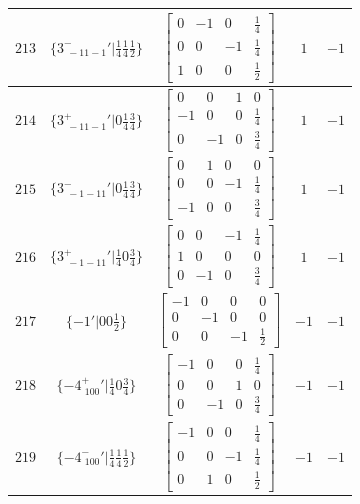 \documentclass[fleqn,8pt]{jsarticle}
\begin{document}
\begin{longtable}{ccccc}
$ 213 $ & $ \{3^{-}_{\,\,-11-1}{}'|\frac{1}{4} \frac{1}{4} \frac{1}{2}\} $ & $ \begin{bmatrix} 0 & -1 & 0 & \frac{1}{4} \\ 0 & 0 & -1 & \frac{1}{4} \\ 1 & 0 & 0 & \frac{1}{2} \end{bmatrix} $ & $ 1 $ & $ -1 $ \\ \hline
$ 214 $ & $ \{3^{+}_{\,\,-11-1}{}'|0 \frac{1}{4} \frac{3}{4}\} $ & $ \begin{bmatrix} 0 & 0 & 1 & 0 \\ -1 & 0 & 0 & \frac{1}{4} \\ 0 & -1 & 0 & \frac{3}{4} \end{bmatrix} $ & $ 1 $ & $ -1 $ \\ \hline
$ 215 $ & $ \{3^{-}_{\,\,-1-11}{}'|0 \frac{1}{4} \frac{3}{4}\} $ & $ \begin{bmatrix} 0 & 1 & 0 & 0 \\ 0 & 0 & -1 & \frac{1}{4} \\ -1 & 0 & 0 & \frac{3}{4} \end{bmatrix} $ & $ 1 $ & $ -1 $ \\ \hline
$ 216 $ & $ \{3^{+}_{\,\,-1-11}{}'|\frac{1}{4} 0 \frac{3}{4}\} $ & $ \begin{bmatrix} 0 & 0 & -1 & \frac{1}{4} \\ 1 & 0 & 0 & 0 \\ 0 & -1 & 0 & \frac{3}{4} \end{bmatrix} $ & $ 1 $ & $ -1 $ \\ \hline
$ 217 $ & $ \{-1{}'|0 0 \frac{1}{2}\} $ & $ \begin{bmatrix} -1 & 0 & 0 & 0 \\ 0 & -1 & 0 & 0 \\ 0 & 0 & -1 & \frac{1}{2} \end{bmatrix} $ & $ -1 $ & $ -1 $ \\ \hline
$ 218 $ & $ \{-4^{+}_{\,\,100}{}'|\frac{1}{4} 0 \frac{3}{4}\} $ & $ \begin{bmatrix} -1 & 0 & 0 & \frac{1}{4} \\ 0 & 0 & 1 & 0 \\ 0 & -1 & 0 & \frac{3}{4} \end{bmatrix} $ & $ -1 $ & $ -1 $ \\ \hline
$ 219 $ & $ \{-4^{-}_{\,\,100}{}'|\frac{1}{4} \frac{1}{4} \frac{1}{2}\} $ & $ \begin{bmatrix} -1 & 0 & 0 & \frac{1}{4} \\ 0 & 0 & -1 & \frac{1}{4} \\ 0 & 1 & 0 & \frac{1}{2} \end{bmatrix} $ & $ -1 $ & $ -1 $ \\ \hline

\end{longtable}
\end{document}
